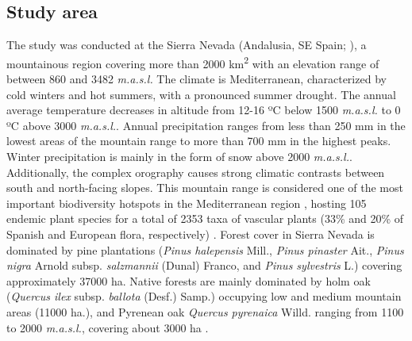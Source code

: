 \subsection{Study area}\label{sec:multivar:StudyArea}
The study was conducted at the Sierra Nevada (Andalusia, SE Spain; ), a mountainous region covering more than 2000 km\textsuperscript{2} with an elevation range of between 860 and 3482 \emph{m.a.s.l.} The climate is Mediterranean, characterized by cold winters and hot summers, with a pronounced summer drought. The annual average temperature decreases in altitude from 12-16 ºC below 1500 \emph{m.a.s.l.} to 0 ºC above 3000 \emph{m.a.s.l.}. Annual precipitation ranges from less than 250 mm in the lowest areas of the mountain range to more than 700 mm in the highest peaks. Winter precipitation is mainly in the form of snow above 2000 \emph{m.a.s.l.}. Additionally, the complex orography causes strong climatic contrasts between south and north-facing slopes. This mountain range is considered one of the most important biodiversity hotspots in the Mediterranean region \autocite{Blancaetal1998ThreatenedVascular}, hosting 105 endemic plant species for a total of 2353 taxa of vascular plants (33\% and 20\% of Spanish and European flora, respectively) \autocite{Lorite2016UpdatedChecklist}. Forest cover in Sierra Nevada is dominated by pine plantations (\emph{Pinus halepensis} Mill., \emph{Pinus pinaster} Ait., \emph{Pinus nigra} Arnold subsp. \emph{salzmannii} (Dunal) Franco, and \emph{Pinus sylvestris} L.) covering approximately 37000 ha. Native forests are mainly dominated by holm oak (\emph{Quercus ilex} subsp. \emph{ballota} (Desf.) Samp.) occupying low and medium mountain areas (11000 ha.), and Pyrenean oak \emph{Quercus pyrenaica} Willd. ranging from 1100 to 2000 \emph{m.a.s.l.}, covering about 3000 ha \autocite{PerezLuqueetal2019MapEcosystems}.

